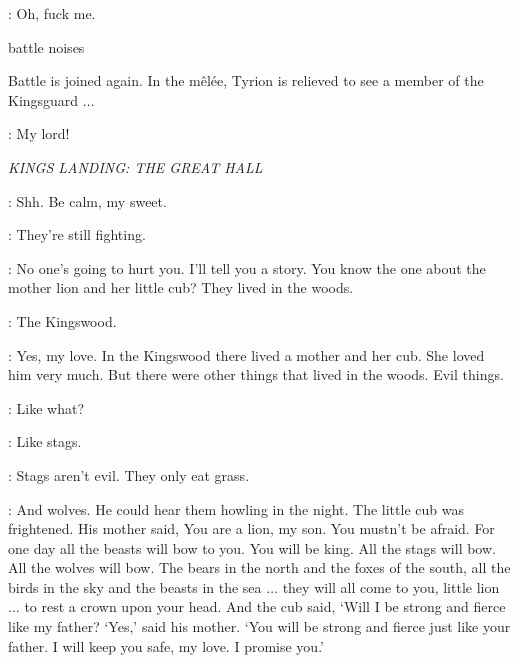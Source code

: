 \TYRION:  Oh, fuck me. 

\sfx battle noises

\n Battle is joined again. In the m\^el\'ee, Tyrion is relieved to see a member of the Kingsguard $\ldots$



\PODRICK:  My lord!


\scene

\textit{KINGS LANDING: THE GREAT HALL}


\CERSEI: Shh. Be calm, my sweet. 

\TOMMEN: They're still fighting. 

\CERSEI: No one's going to hurt you. I'll tell you a story. You know the one about the mother lion and her little cub? They lived in the woods. 

\TOMMEN: The Kingswood. 

\CERSEI: Yes, my love. In the Kingswood there lived a mother and her cub. She loved him very much. But there were other things that lived in the woods. Evil things. 

\TOMMEN: Like what? 

\CERSEI: Like stags. 

\TOMMEN: Stags aren't evil. They only eat grass. 

\CERSEI: And wolves. He could hear them howling in the night. The little cub was frightened. His mother said, You are a lion, my son. You mustn't be afraid. For one day all the beasts will bow to you. You will be king. All the stags will bow. All the wolves will bow. The bears in the north and the foxes of the south, all the birds in the sky and the beasts in the sea $\ldots$ they will all come to you, little lion $\ldots$ to rest a crown upon your head. And the cub said, `Will I be strong and fierce like my father? `Yes,' said his mother. `You will be strong and fierce just like your father. I will keep you safe, my love. I promise you.'

